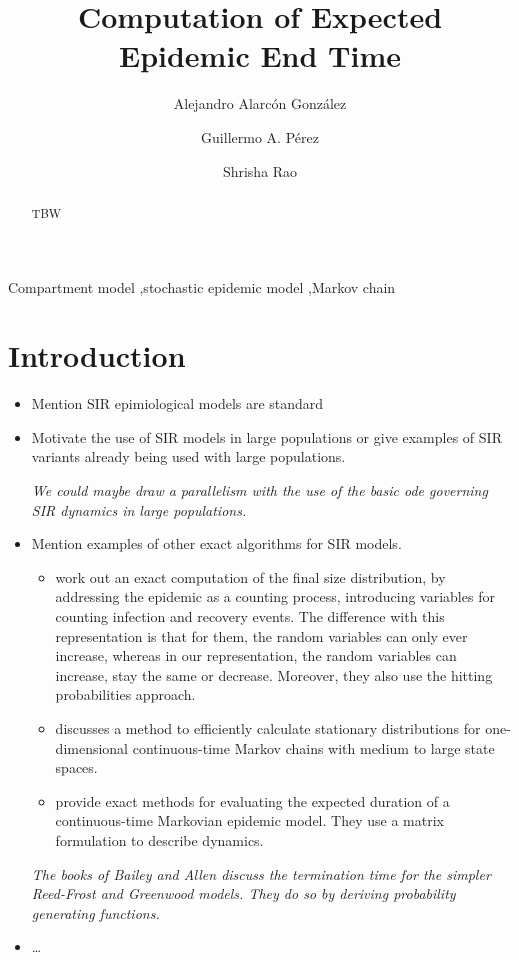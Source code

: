 \documentclass[a4paper,preprint]{elsarticle}
\begin{document}
\title{Computation of Expected Epidemic End Time}

\author[1]{Alejandro Alarc\'on Gonz\'alez}
\author[1]{Guillermo A. P\'erez}
\author[1]{Shrisha Rao}

\begin{abstract}
  TBW
\end{abstract}

\begin{keyword}
  Compartment model \sep stochastic epidemic model \sep Markov chain
\end{keyword}

\maketitle

\section{Introduction}
\begin{itemize}
    \item Mention SIR epimiological models are standard
    \item Motivate the use of SIR models in large populations or give examples of SIR variants already being used with large populations.
    
    \textit{We could maybe draw a parallelism with the use of the basic ode governing SIR dynamics in large populations.}
    \item Mention examples of other exact algorithms for SIR models.
    \begin{itemize}
        \item \cite{BLACK2015159} work out an exact computation of the final size distribution, by addressing the epidemic as a counting process, introducing variables for counting infection and recovery events. The difference with this representation is that for them, the random variables can only ever increase, whereas in our representation, the random variables can increase, stay the same or decrease. Moreover, they also use the hitting probabilities approach.
        \item \cite{KEELING2009133} discusses a method to efficiently calculate stationary distributions for one-dimensional continuous-time Markov chains with medium to large state spaces.
        \item \cite{keeling2008methods} provide exact methods for evaluating the expected duration of a  continuous-time Markovian epidemic model. They use a matrix formulation to describe dynamics.
    \end{itemize}
    \textit{The books of Bailey and Allen discuss the termination time for the simpler Reed-Frost and Greenwood models. They do so by deriving probability generating functions.} 
    \item \dots
\end{itemize}
\end{document}

